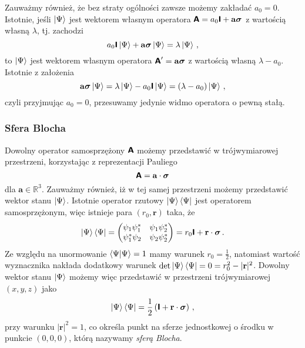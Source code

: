 \documentclass{myclass}
\begin{document}
\begin{itemize}
    Zauważmy również, że bez straty ogólności zawsze możemy zakładać \(a_0=0\). Istotnie, jeśli
    \(\ket{\Psi}\) jest wektorem własnym operatora \(\boldsymbol{\mathsf{A}} =
    a_0\boldsymbol{\mathsf{I}}+\mathbf{a}\boldsymbol{\sigma}\) z wartością własną \(\lambda\), tj. zachodzi
    \begin{equation*}
        a_0\boldsymbol{\mathsf{I}}\ket{\Psi}+\mathbf{a}\boldsymbol{\sigma}\ket{\Psi} = \lambda\ket{\Psi}\,,
    \end{equation*}
    to \(\ket{\Psi}\) jest wektorem własnym operatora \(\boldsymbol{\mathsf{A}}' = \mathbf{a}\boldsymbol{\sigma}\)
    z wartością własną \(\lambda-a_0\). Istotnie z założenia
    \begin{equation*}
        \mathbf{a}\boldsymbol{\sigma}\ket{\Psi} = \lambda\ket{\Psi} - a_0\boldsymbol{\mathsf{I}}\ket{\Psi} = (\lambda-a_0)\ket{\Psi}\,,
    \end{equation*}
    czyli przyjmując \(a_0 = 0\), przesuwamy jedynie widmo operatora o pewną stałą.

\end{itemize}

\subsubsection{Sfera Blocha}

Dowolny operator samosprzężony \(\boldsymbol{\mathsf{A}}\) możemy przedstawić w trójwymiarowej przestrzeni,
korzystając z reprezentacji Pauliego
\begin{equation*}
    \boldsymbol{\mathsf{A}} = \mathbf{a} \cdot \boldsymbol{\sigma}
\end{equation*}
dla \(\mathbf{a} \in \mathbb{R}^3\). Zauważmy również, iż w tej samej przestrzeni możemy przedstawić
wektor stanu \(\ket{\Psi}\). Istotnie operator rzutowy \(\ket{\Psi}\bra{\Psi}\) jest operatorem
samosprzężonym, więc istnieje para \((r_0,\mathbf{r})\) taka, że
\begin{equation*}
    \ket{\Psi}\bra{\Psi} = \mqty(\psi_1\psi_1^* & \psi_1\psi_2^* \\ \psi_1^*\psi_2 & \psi_2\psi_2^*) = r_0\oper{I} + \mathbf{r}\cdot\boldsymbol{\sigma}\,.
\end{equation*}
Ze względu na unormowanie \(\braket{\Psi} = 1\) mamy warunek \(r_0 = \frac{1}{2}\), natomiast
wartość wyznacznika nakłada dodatkowy warunek \(\det\ket{\Psi}\bra{\Psi} = 0 = r_0^2 -
|\mathbf{r}|^2\). Dowolny wektor stanu \(\ket{\Psi}\) możemy więc przedstawić w przestrzeni
trójwymiarowej \((x,y,z)\) jako
\begin{equation*}
    \ket{\Psi}\bra{\Psi} = \frac{1}{2}\left(\boldsymbol{\mathsf{I}} + \mathbf{r}\cdot\boldsymbol{\sigma}\right)\,,
\end{equation*}
przy warunku \(|\mathbf{r}|^2 = 1\), co określa punkt na sferze jednostkowej o środku w punkcie
\((0,0,0)\), którą nazywamy \textit{sferą Blocha}.
\medskip
\end{document}
